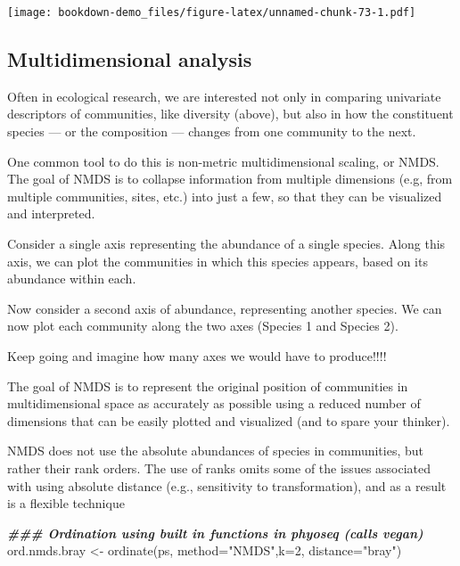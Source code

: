 \documentclass[
]{book}
\newenvironment{Shaded}{\begin{snugshade}}{\end{snugshade}}
\newcommand{\AttributeTok}[1]{\textcolor[rgb]{0.77,0.63,0.00}{#1}}
\newcommand{\DecValTok}[1]{\textcolor[rgb]{0.00,0.00,0.81}{#1}}
\newcommand{\DocumentationTok}[1]{\textcolor[rgb]{0.56,0.35,0.01}{\textbf{\textit{#1}}}}
\newcommand{\FunctionTok}[1]{\textcolor[rgb]{0.00,0.00,0.00}{#1}}
\newcommand{\NormalTok}[1]{#1}
\newcommand{\OtherTok}[1]{\textcolor[rgb]{0.56,0.35,0.01}{#1}}
\newcommand{\StringTok}[1]{\textcolor[rgb]{0.31,0.60,0.02}{#1}}
\begin{document}
\texttt{[image: bookdown-demo\_files/figure-latex/unnamed-chunk-73-1.pdf]}

\hypertarget{multidimensional-analysis}{%
\subsection{Multidimensional analysis}\label{multidimensional-analysis}}

Often in ecological research, we are interested not only in comparing univariate descriptors of communities, like diversity (above), but also in how the constituent species --- or the composition --- changes from one community to the next.

One common tool to do this is non-metric multidimensional scaling, or NMDS. The goal of NMDS is to collapse information from multiple dimensions (e.g, from multiple communities, sites, etc.) into just a few, so that they can be visualized and interpreted.

Consider a single axis representing the abundance of a single species. Along this axis, we can plot the communities in which this species appears, based on its abundance within each.

Now consider a second axis of abundance, representing another species. We can now plot each community along the two axes (Species 1 and Species 2).

Keep going and imagine how many axes we would have to produce!!!!

The goal of NMDS is to represent the original position of communities in multidimensional space as accurately as possible using a reduced number of dimensions that can be easily plotted and visualized (and to spare your thinker).

NMDS does not use the absolute abundances of species in communities, but rather their rank orders. The use of ranks omits some of the issues associated with using absolute distance (e.g., sensitivity to transformation), and as a result is a flexible technique

\begin{Shaded}
\begin{Highlighting}[]
    \DocumentationTok{\#\#\# Ordination using built in functions in phyoseq (calls vegan)    }
\NormalTok{ord.nmds.bray }\OtherTok{\textless{}{-}} \FunctionTok{ordinate}\NormalTok{(ps, }\AttributeTok{method=}\StringTok{"NMDS"}\NormalTok{,}\AttributeTok{k=}\DecValTok{2}\NormalTok{, }\AttributeTok{distance=}\StringTok{"bray"}\NormalTok{)}
\end{Highlighting}
\end{Shaded}
\end{document}
